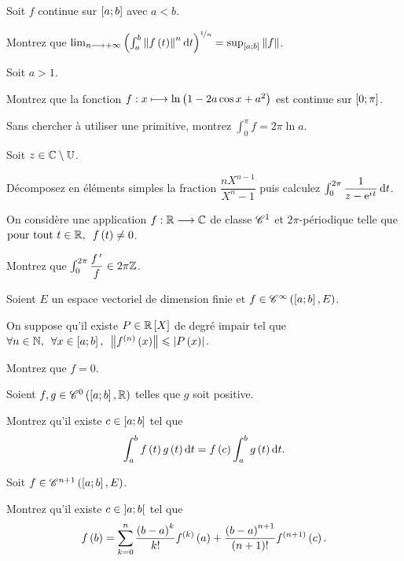 \begin{exoss}
Soit \(f\) continue sur \(\left[a;b\right]\) avec \(a<b\).

Montrez que \(\lim_{n\to\pinf}\paren{\int_a^b\norme{f\paren{t}}^n\odif{t}}^{\nicefrac{1}{n}}=\sup_{\intervii{a}{b}}\norme{f}\).
\end{exoss}

\begin{exoss}
Soit \(a>1\).

Montrez que la fonction \(f:x\longmapsto\ln\left(1-2a\cos x+a^2\right)\) est continue sur \(\left[0;\pi\right]\).

Sans chercher à utiliser une primitive, montrez \(\int_0^\pi f=2\pi\ln a\).
\end{exoss}

\begin{exoss}
Soit \(z\in\mathbb{C}\setminus\mathbb{U}\).

Décomposez en éléments simples la fraction \(\dfrac{nX^{n-1}}{X^n-1}\) puis calculez \(\int_0^{2\pi}\dfrac{1}{z-\e{\i t}}\odif{t}\).
\end{exoss}

\begin{exoss}
On considère une application \(f:\mathbb{R}\longrightarrow\mathbb{C}\) de classe \(\mathscr{C}^{1}\) et \(2\pi\)-périodique telle que \(\quantifs{\tpt t\in\R}f\paren{t}\not=0\).

Montrez que \(\int_0^{2\pi}\dfrac{f^{\,\prime}}{f}\in2\pi\mathbb{Z}\).
\end{exoss}

\begin{exoss}
Soient \(E\) un espace vectoriel de dimension finie et \(f\in\mathscr{C}^{\infty}\left(\left[a;b\right],E\right)\).

On suppose qu'il existe \(P\in\poly[\R]\) de degré impair tel que \(\quantifs{\forall n\in\N;\forall x\in\intervii{a}{b}}\norme{f\deriv{n}\paren{x}}\leq\abs{P\paren{x}}\).

Montrez que \(f=0\).
\end{exoss}

\begin{exoss}
Soient \(f,g\in\mathscr{C}^{0}\left(\left[a;b\right],\mathbb{R}\right)\) telles que \(g\) soit positive.

Montrez qu'il existe \(c\in\left[a;b\right]\) tel que \[\int_a^bf\paren{t}g\paren{t}\odif{t}=f\paren{c}\int_a^bg\paren{t}\odif{t}.\]
\end{exoss}

\begin{exoss}
Soit \(f\in\mathscr{C}^{n+1}\left(\left[a;b\right],E\right)\).

Montrez qu'il existe \(c\in\left]a;b\right[\) tel que \[f\left(b\right)=\sum_{k=0}^n\dfrac{\left(b-a\right)^k}{k!}f^{\left(k\right)}\left(a\right)+\dfrac{\left(b-a\right)^{n+1}}{\left(n+1\right)!}f^{\left(n+1\right)}\left(c\right).\]
\end{exoss}

